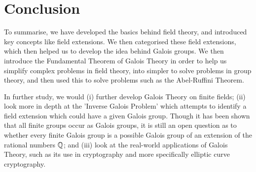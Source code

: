\section{Conclusion}
To summarise, we have developed the basics behind field theory, and introduced key concepts like field extensions. We then categorised these field extensions, which then helped us to develop the idea behind Galois groups. We then introduce the Fundamental Theorem of Galois Theory in order to help us simplify complex problems in field theory, into simpler to solve problems in group theory, and then used this to solve problems such as the Abel-Ruffini Theorem.

In further study, we would (i) further develop Galois Theory on finite fields; (ii) look more in depth at the 'Inverse Galois Problem' which attempts to identify a field extension which could have a given Galois group. Though it has been shown that all finite groups occur as Galois groups, it is still an open question as to whether every finite Galois group is a possible Galois group of an extension of the rational numbers $\mathbb Q$; and (iii) look  at the real-world applications of Galois Theory, such as its use in cryptography and more specifically elliptic curve cryptography.

